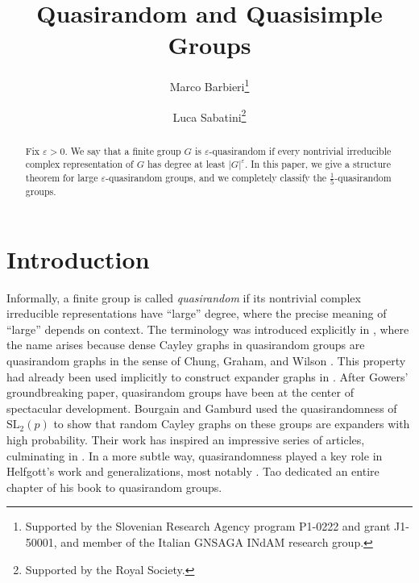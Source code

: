 \documentclass{daj}
\theoremstyle{definition}
\theoremstyle{remark}
\newcommand{\SL}{\mathrm{SL}}
\begin{document}
\begin{frontmatter}[classification=text]

\title{Quasirandom and Quasisimple Groups} %

\author[mb]{Marco Barbieri\thanks{Supported by the Slovenian Research Agency program P1-0222 and grant J1-50001, and member of the Italian GNSAGA INdAM research group.}}
\author[ls]{Luca Sabatini\thanks{Supported by the Royal Society.}}


\begin{abstract}
Fix $\varepsilon > 0$.
We say that a finite group $G$ is $\varepsilon$-quasirandom if every nontrivial irreducible complex representation of $G$
has degree at least $|G|^\varepsilon$.
In this paper, we give a structure theorem for large $\varepsilon$-quasirandom groups,
and we completely classify the $\frac{1}{5}$-quasirandom groups.
\end{abstract}
\end{frontmatter}

\section{Introduction}
 
Informally, a finite group is called {\itshape quasirandom} if its nontrivial complex irreducible representations have ``large'' degree,
where the precise meaning of ``large'' depends on context.
The terminology was introduced explicitly in \cite{Gow08},
where the name arises because dense Cayley graphs in quasirandom groups are
quasirandom graphs in the sense of Chung, Graham, and Wilson \cite{CGW89}.
This property had already been used implicitly to construct expander graphs in \cite{Gam02,SX91}.
After Gowers' groundbreaking paper, quasirandom groups have been at the center of spectacular development.
Bourgain and Gamburd \cite{BG08} used the quasirandomness of $\SL_2(p)$ to show that random Cayley graphs on these groups
are expanders with high probability.
Their work has inspired an impressive series of articles, culminating in \cite{BGGT15}.
In a more subtle way, quasirandomness played a key role in Helfgott's work \cite{Hel08} and generalizations,
most notably \cite{BGT11,EMPS23,PS16}.
Tao dedicated an entire chapter of his book \cite{Tao15} to quasirandom groups.
\end{document}
